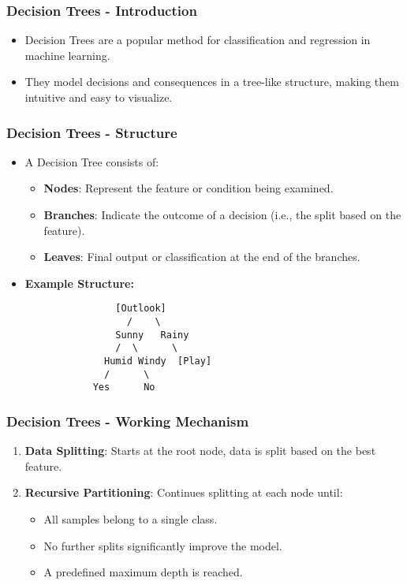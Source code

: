\documentclass[aspectratio=169]{beamer}
\begin{document}
\begin{frame}[fragile]
    \frametitle{Decision Trees - Introduction}
    \begin{itemize}
        \item Decision Trees are a popular method for classification and regression in machine learning.
        \item They model decisions and consequences in a tree-like structure, making them intuitive and easy to visualize.
    \end{itemize}
\end{frame}

\begin{frame}[fragile]
    \frametitle{Decision Trees - Structure}
    \begin{itemize}
        \item A Decision Tree consists of:
        \begin{itemize}
            \item \textbf{Nodes}: Represent the feature or condition being examined.
            \item \textbf{Branches}: Indicate the outcome of a decision (i.e., the split based on the feature).
            \item \textbf{Leaves}: Final output or classification at the end of the branches.
        \end{itemize}
        \item \textbf{Example Structure:}
        \begin{verbatim}
                [Outlook]
                  /    \
                Sunny   Rainy
                /  \      \
              Humid Windy  [Play]
              /      \      
            Yes      No
        \end{verbatim}
    \end{itemize}
\end{frame}

\begin{frame}[fragile]
    \frametitle{Decision Trees - Working Mechanism}
    \begin{enumerate}
        \item \textbf{Data Splitting}: Starts at the root node, data is split based on the best feature.
        \item \textbf{Recursive Partitioning}: Continues splitting at each node until:
        \begin{itemize}
            \item All samples belong to a single class.
            \item No further splits significantly improve the model.
            \item A predefined maximum depth is reached.
        \end{itemize}
    \end{enumerate}
\end{frame}
\end{document}
